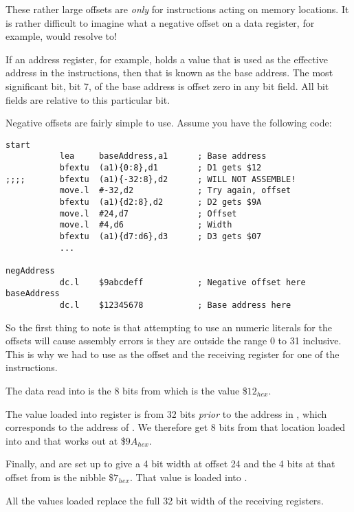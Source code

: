 These rather large offsets are \emph{only} for instructions acting on memory locations. It is rather difficult to imagine what a negative offset on a data register, for example, would resolve to!

If an address register, for example, holds a value that is used as the effective address in the instructions, then that is known as the base address. The most significant bit, bit 7, of the base address is offset zero in any bit field. All bit fields are relative to this particular bit.

Negative offsets are fairly simple to use. Assume you have the following code:

\begin{lstlisting}[firstnumber=1,caption={Bit Field Negative Offsets Example}]
start
           lea     baseAddress,a1      ; Base address
           bfextu  (a1){0:8},d1        ; D1 gets $12
;;;;       bfextu  (a1){-32:8},d2      ; WILL NOT ASSEMBLE!
           move.l  #-32,d2             ; Try again, offset
           bfextu  (a1){d2:8},d2       ; D2 gets $9A      
           move.l  #24,d7              ; Offset
           move.l  #4,d6               ; Width
           bfextu  (a1){d7:d6},d3      ; D3 gets $07
           ...

negAddress
           dc.l    $9abcdeff		   ; Negative offset here
baseAddress
           dc.l    $12345678           ; Base address here
\end{lstlisting}

So the first thing to note is that attempting to use an numeric literals for the offsets will cause assembly errors is they are outside the range 0 to 31 inclusive. This is why we had to use  as the offset and the receiving register for one of the instructions.

The data read into  is the 8 bits from  which is the value \$$12_{hex}$. 

The value loaded into register  is from 32 bits \emph{prior} to the address in , which corresponds to the address of . We therefore get 8 bits from that location loaded into  and that works out at \$$9A_{hex}$.

Finally,  and  are set up to give a 4 bit width at offset 24 and the 4 bits at that offset from  is the nibble \$$7_{hex}$. That value is loaded into .

All the values loaded replace the full 32 bit width of the receiving registers.


